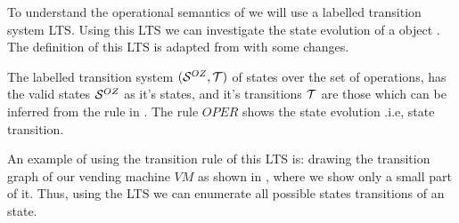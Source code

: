 To understand the operational semantics of \oz{} we will use  a labelled transition system LTS. Using this LTS we can investigate the state evolution of a \oz{} object . The definition of this LTS is adapted from  with some changes.

\begin{definition}[LTS of \oz{}]
\label{def_oz_trans_system}
The labelled transition system $(\stats,\traces)$ of \oz{} states over the set of operations, has the valid states $\mathcal S^{OZ}$ as it's states, and it's transitions $\traces$ are those which can be inferred from the rule in .
The rule $OPER$ shows the state evolution .i.e, state transition.

\end{definition}
An example of using the transition rule of this LTS is: drawing the transition graph of our vending machine $VM$ as shown in , where we show only a small part of it. Thus, using the LTS we can enumerate all possible states transitions of an \oz{} state.


